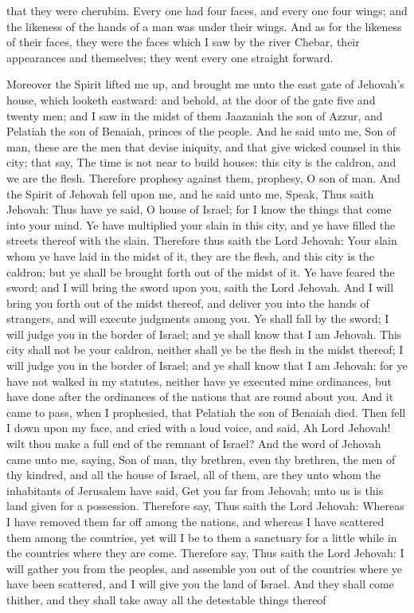 that they were cherubim. Every one had four faces, and every one four wings; and the likeness of the hands of a man was under their wings. And as for the likeness of their faces, they were the faces which I saw by the river Chebar, their appearances and themselves; they went every one straight forward. 

Moreover the Spirit lifted me up, and brought me unto the east gate of Jehovah’s house, which looketh eastward: and behold, at the door of the gate five and twenty men; and I saw in the midst of them Jaazaniah the son of Azzur, and Pelatiah the son of Benaiah, princes of the people. And he said unto me, Son of man, these are the men that devise iniquity, and that give wicked counsel in this city; that say, The time is not near to build houses: this city is the caldron, and we are the flesh. Therefore prophesy against them, prophesy, O son of man.  And the Spirit of Jehovah fell upon me, and he said unto me, Speak, Thus saith Jehovah: Thus have ye said, O house of Israel; for I know the things that come into your mind. Ye have multiplied your slain in this city, and ye have filled the streets thereof with the slain. Therefore thus saith the Lord Jehovah: Your slain whom ye have laid in the midst of it, they are the flesh, and this city is the caldron; but ye shall be brought forth out of the midst of it. Ye have feared the sword; and I will bring the sword upon you, saith the Lord Jehovah. And I will bring you forth out of the midst thereof, and deliver you into the hands of strangers, and will execute judgments among you. Ye shall fall by the sword; I will judge you in the border of Israel; and ye shall know that I am Jehovah. This city shall not be your caldron, neither shall ye be the flesh in the midst thereof; I will judge you in the border of Israel; and ye shall know that I am Jehovah: for ye have not walked in my statutes, neither have ye executed mine ordinances, but have done after the ordinances of the nations that are round about you.  And it came to pass, when I prophesied, that Pelatiah the son of Benaiah died. Then fell I down upon my face, and cried with a loud voice, and said, Ah Lord Jehovah! wilt thou make a full end of the remnant of Israel?  And the word of Jehovah came unto me, saying, Son of man, thy brethren, even thy brethren, the men of thy kindred, and all the house of Israel, all of them, are they unto whom the inhabitants of Jerusalem have said, Get you far from Jehovah; unto us is this land given for a possession. Therefore say, Thus saith the Lord Jehovah: Whereas I have removed them far off among the nations, and whereas I have scattered them among the countries, yet will I be to them a sanctuary for a little while in the countries where they are come. Therefore say, Thus saith the Lord Jehovah: I will gather you from the peoples, and assemble you out of the countries where ye have been scattered, and I will give you the land of Israel. And they shall come thither, and they shall take away all the detestable things thereof 